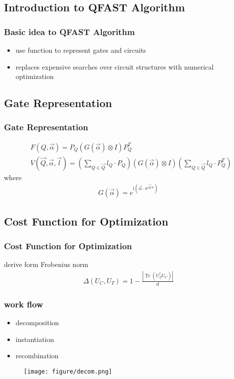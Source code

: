 \documentclass[aspectratio=1610]{beamer}
\begin{document}
\subsection{Introduction to QFAST Algorithm}
\begin{frame}
\frametitle{Basic idea to QFAST Algorithm}
\begin{itemize}
  \item use function to represent gates and circuits
  \item replaces expensive searches over circuit structures with numerical optimization
\end{itemize}
\end{frame}

\subsection{Gate Representation}
\begin{frame}
\frametitle{Gate Representation}

\begin{align}
  &F(Q, \vec{\alpha})=P_{Q}(G(\vec{\alpha}) \otimes I) P_{Q}^{T}\\
  &V(\vec{Q}, \vec{\alpha}, \vec{l})=\left(\sum_{Q \in \vec{Q}} l_{Q} \cdot P_{Q}\right)(G(\vec{\alpha}) \otimes I)\left(\sum_{Q \in \vec{Q}} l_{Q} \cdot P_{Q}^{T}\right)
\end{align}
where
\begin{align}
  G(\vec{\alpha})=e^{\mathrm{i}\left(\vec{\alpha} \cdot \sigma^{\vec{\otimes} n}\right)}
\end{align}
\end{frame}

\subsection{Cost Function for Optimization}
\begin{frame}
\frametitle{Cost Function for Optimization}
derive form Frobenius norm
\begin{align}
  \Delta\left(U_{C}, U_{T}\right)=1-\frac{\left|\operatorname{Tr}\left(U_{T}^{\dagger} U_{C}\right)\right|}{d}
\end{align}
\end{frame}
\begin{frame}
  \frametitle{work flow}
  \begin{itemize}
    \item decomposition
    \item instantiation
    \item recombination
  \end{itemize}
  \begin{figure}
    \texttt{[image: figure/decom.png]}
  \end{figure}
\end{frame}
\end{document}
